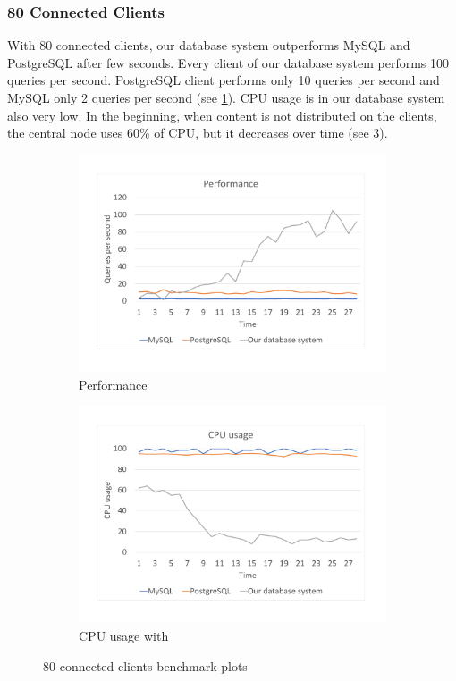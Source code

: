 \subsubsection*{80 Connected Clients}
With 80 connected clients, our database system outperforms MySQL and PostgreSQL after few seconds. Every client of our database system performs 100 queries per second. PostgreSQL client performs only 10 queries per second and MySQL only 2 queries per second (see \ref{bench80per}). CPU usage is in our database system also very low. In the beginning, when content is not distributed on the clients, the central node uses 60\% of CPU, but it decreases over time (see \ref{bench80cpu}).


\begin{figure}[h]
    \begin{subfigure}{.5\textwidth}
        \centering
        \includegraphics[trim={1.78cm 2cm 2.08cm 1cm},clip,width=1.0\linewidth]{excel/80per.pdf}
        \caption{Performance}
        \label{bench80per}
    \end{subfigure}
    \begin{subfigure}{.5\textwidth}
        \centering
        \includegraphics[trim={1.78cm 2cm 2.08cm 1cm},clip,width=1.0\linewidth]{excel/80cpu.pdf}
        \caption{CPU usage with}
        \label{bench80cpu}
    \end{subfigure}
    \caption{80 connected clients benchmark plots}
\end{figure}


